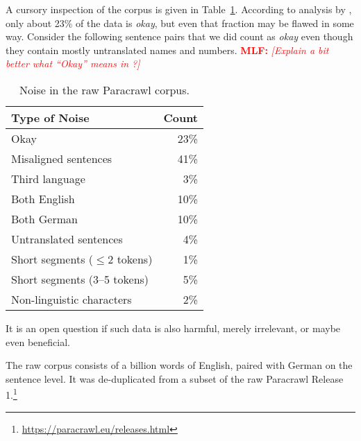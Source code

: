 \documentclass[11pt,a4paper]{article}
\newcommand{\todomlf}[1] {\textcolor{red}{\textbf{MLF:} \em [#1]}\marginpar{\textcolor{red}{\Large \textbf{!!!}}}}
\begin{document}
A cursory inspection of the corpus is given in Table~\ref{tab:paracrawl-noise}. According to analysis by \citet{W18-2709}, only about 23\% of the data is {\em okay}, but even that fraction may be flawed in some way.
Consider the following sentence pairs that 
we did count as {\em okay} even though they contain mostly untranslated names and numbers. \todomlf{Explain a bit better what ``Okay'' means in \citet{W18-2709}?}

\vspace{1mm}
\vspace{2mm}

\begin{table}
\begin{center}
\begin{tabular}{l|r}
\bf Type of Noise & \bf Count\\ \hline
Okay & 23\%\\ \hline
Misaligned sentences & 41\%\\\hline
Third language & 3\% \\
Both English & 10\% \\
Both German & 10\% \\\hline
Untranslated sentences & 4\%\\ \hline
Short segments ($\leq$2 tokens) & 1\% \\
Short segments (3--5 tokens) & 5\% \\\hline
Non-linguistic characters & 2\% \\\hline
\end{tabular}
\caption{Noise in the raw Paracrawl corpus.}
\label{tab:paracrawl-noise}
\end{center}
\end{table}

It is an open question if such data is also harmful, merely irrelevant, or maybe even beneficial. 

The raw corpus consists of a billion words of English, paired with German on the sentence level. It was de-duplicated from a subset of the raw Paracrawl Release 1.\footnote{\url{https://paracrawl.eu/releases.html}}
\end{document}
